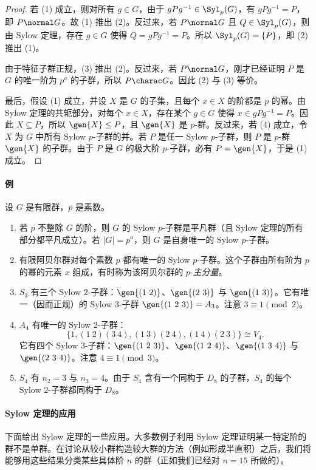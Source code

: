 \begin{proof}
若 (1) 成立，则对所有 $g\in G$，由于 $gPg^{-1}\in\Syl_p(G)$，有 $gPg^{-1}=P$，即 $P\normal G$。故 (1) 推出 (2)。反过来，若 $P\normal G$ 且 $Q\in\Syl_p(G)$，则由 Sylow 定理，存在 $g\in G$ 使得 $Q=gPg^{-1}=P$。所以 $\Syl_p(G)=\{P\}$，即 (2) 推出 (1)。

由于特征子群正规，(3) 推出 (2)。反过来，若 $P\normal G$，刚才已经证明 $P$ 是 $G$ 的唯一阶为 $p^a$ 的子群，所以 $P\charac G$。因此 (2) 与 (3) 等价。

最后，假设 (1) 成立，并设 $X$ 是 $G$ 的子集，且每个 $x\in X$ 的阶都是 $p$ 的幂。由 Sylow 定理的共轭部分，对每个 $x\in X$，存在某个 $g\in G$ 使得 $x\in gPg^{-1}=P$。因此 $X\subseteq P$，所以 $\gen{X}\leq P$，且 $\gen{X}$ 是 $p$-群。反过来，若 (4) 成立，令 $X$ 为 $G$ 中所有 Sylow $p$-子群的并。若 $P$ 是任一 Sylow $p$-子群，则 $P$ 是 $p$-群 $\gen{X}$ 的子群。由于 $P$ 是 $G$ 的极大阶 $p$-子群，必有 $P=\gen{X}$，于是 (1) 成立。
\end{proof}

\paragraph{例}
设 $G$ 是有限群，$p$ 是素数。
\begin{enumerate}[label=(\arabic*)]
  \item 若 $p$ 不整除 $G$ 的阶，则 $G$ 的 Sylow $p$-子群是平凡群（且 Sylow 定理的所有部分都平凡成立）。若 $|G|=p^a$，则 $G$ 是自身唯一的 Sylow $p$-子群。
  \item 有限阿贝尔群对每个素数 $p$ 都有唯一的 Sylow $p$-子群。这个子群由所有阶为 $p$ 的幂的元素 $x$ 组成，有时称为该阿贝尔群的 $p$-\emph{主分量}。
  \item $S_3$ 有三个 Sylow $2$-子群：$\gen{(1\ 2)}$、$\gen{(2\ 3)}$ 与 $\gen{(1\ 3)}$。它有唯一（因而正规）的 Sylow $3$-子群 $\gen{(1\ 2\ 3)}=A_3$。注意 $3\equiv1\pmod2$。
  \item $A_4$ 有唯一的 Sylow $2$-子群：
  \[
    \{1,(1\ 2)(3\ 4),(1\ 3)(2\ 4),(1\ 4)(2\ 3)\}\cong V_4.
  \]
  它有四个 Sylow $3$-子群：$\gen{(1\ 2\ 3)}$、$\gen{(1\ 2\ 4)}$、$\gen{(1\ 3\ 4)}$ 与 $\gen{(2\ 3\ 4)}$。注意 $4\equiv1\pmod3$。
  \item $S_4$ 有 $n_2=3$ 与 $n_3=4$。由于 $S_4$ 含有一个同构于 $D_8$ 的子群，$S_4$ 的每个 Sylow $2$-子群都同构于 $D_8$。
\end{enumerate}

\paragraph{Sylow 定理的应用}
下面给出 Sylow 定理的一些应用。大多数例子利用 Sylow 定理证明某一特定阶的群不是单群。在讨论从较小群构造较大群的方法（例如形成半直积）之后，我们将能够用这些结果分类某些具体阶 $n$ 的群（正如我们已经对 $n=15$ 所做的）。

